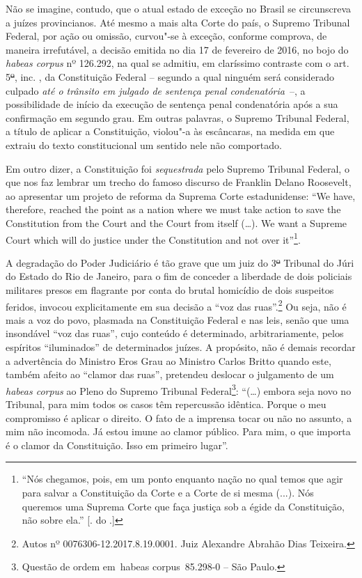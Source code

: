 Não se imagine, contudo, que o atual estado de exceção no Brasil se
circunscreva a juízes provincianos. Até mesmo a mais alta Corte do país,
o Supremo Tribunal Federal, por ação ou omissão, curvou"-se à exceção,
conforme comprova, de maneira irrefutável, a decisão emitida no dia 17
de fevereiro de 2016, no bojo do \emph{habeas corpus} nº 126.292, na
qual se admitiu, em claríssimo contraste com o art. 5\sout{º}, inc.
, da Constituição Federal -- segundo a qual ninguém será considerado
culpado \emph{até o trânsito em julgado de sentença penal condenatória}~--,
a possibilidade de início da execução de sentença penal condenatória
após a sua confirmação em segundo grau. Em outras palavras, o Supremo
Tribunal Federal, a título de aplicar a Constituição, violou"-a às
escâncaras, na medida em que extraiu do texto constitucional um sentido
nele não comportado.

Em outro dizer, a Constituição foi \emph{sequestrada} pelo Supremo
Tribunal Federal, o que nos faz lembrar um trecho do famoso discurso de
Franklin Delano Roosevelt, ao apresentar um projeto de reforma da
Suprema Corte estadunidense: ``We have, therefore, reached the point as
a nation where we must take action to save the Constitution from the
Court and the Court from itself (\ldots{}). We want a Supreme Court which
will do justice under the Constitution and not over it''\footnote{``Nós chegamos,
pois, em um ponto enquanto nação no qual temos que agir para salvar a Constituição
da Corte e a Corte de si mesma (...). Nós queremos uma Suprema Corte que
faça justiça sob a égide da Constituição, não sobre ela.'' [.
do .]}.

A degradação do Poder Judiciário é tão grave que um juiz do 3\sout{º}
Tribunal do Júri do Estado do Rio de Janeiro, para o fim de conceder a
liberdade de dois policiais militares presos em flagrante por conta do
brutal homicídio de dois suspeitos feridos, invocou explicitamente em
sua decisão a ``voz das ruas''.\footnote{Autos nº
  0076306-12.2017.8.19.0001. Juiz Alexandre Abrahão Dias Teixeira.} Ou
seja, não é mais a voz do povo, plasmada na Constituição Federal e nas
leis, senão que uma insondável ``voz das ruas'', cujo conteúdo é
determinado, arbitrariamente, pelos espíritos ``iluminados'' de
determinados juízes. A propósito, não é demais recordar a advertência do
Ministro Eros Grau ao Ministro Carlos Britto quando este, também afeito
ao ``clamor das ruas'', pretendeu deslocar o julgamento de um
\emph{habeas corpus} ao Pleno do Supremo Tribunal Federal\footnote{Questão
  de ordem em~habeas corpus~85.298-0 -- São Paulo.}: ``(\ldots{}) embora seja
novo no Tribunal, para mim todos os casos têm repercussão idêntica.
Porque o meu compromisso é aplicar o direito. O fato de a imprensa tocar
ou não no assunto, a mim não incomoda. Já estou imune ao clamor público.
Para mim, o que importa é o clamor da Constituição. Isso em primeiro
lugar''.

